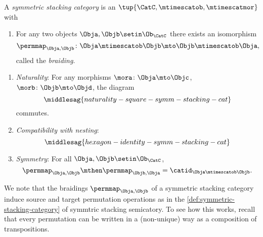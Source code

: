
\begin{ctdefinition}
    \label{def:sym-stacking-cat}
    A \emph{symmetric stacking category} is an  $\tup{\CatC, \mtimescatob, \mtimescatmor}$ with

    \constit

    \begin{enumerate}
        \item For any two objects $\Obja, \Objb \setin \Ob_\CatC$ there exists an isomorphism
              \begin{equation}
                  \permmap_{\Obja, \Objb} \colon \Obja \mtimescatob \Objb \mto \Objb \mtimescatob \Obja,
              \end{equation}
              called the \emph{braiding}.
    \end{enumerate}

    \condit

    \begin{enumerate}
        \item \emph{Naturality}: For any morphisms $\mora \colon \Obja \mto \Objc$, $\morb \colon \Objb \mto \Objd$, the diagram
              \begin{equation}\label{eq:naturality-square-symm-stacking-cat}
                  \middlesag{naturality-square-symm-stacking-cat}
              \end{equation}
              commutes.
        \item \emph{Compatibility with nesting}:
              \begin{equation}\label{eq:hexagon-identity-symm-stacking-cat}
                  \middlesag{hexagon-identity-symm-stacking-cat}
              \end{equation}

        \item \emph{Symmetry}: For all $\Obja, \Objb \setin \Ob_\CatC$,
              \begin{equation}
                  \permmap_{\Obja, \Objb} \mthen \permmap_{\Objb, \Obja} = \catid_{\Obja \mtimescatob \Objb}.
              \end{equation}
    \end{enumerate}

\end{ctdefinition}

We note that the braidings $\permmap_{\Obja, \Objb}$ of a symmetric stacking category induce source and target permutation operations as in the \cref{def:symmetric-stacking-category} of symmtric stacking semicatory.
To see how this works, recall that every permutation can be written in a (non-unique) way as a composition of transpositions.

